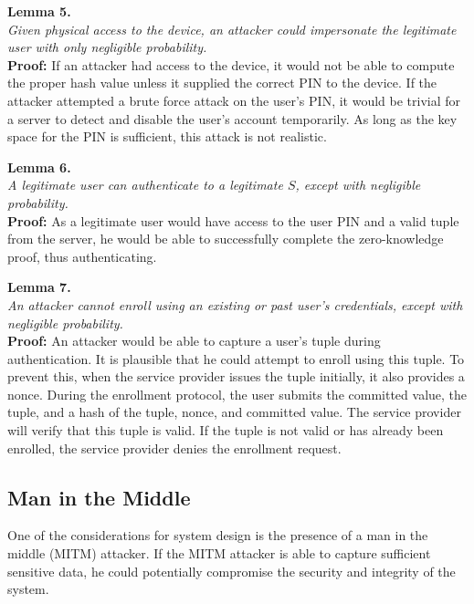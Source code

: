 \noindent \textbf{Lemma 5.} \\
\noindent \emph{Given physical access to the device, an attacker could impersonate the legitimate user with only
negligible probability.} \\
{\bf Proof:}  If an attacker had access to the device, it would not be able to compute the proper hash value unless it
supplied the correct PIN to the device. If the attacker attempted a brute force attack on the user's PIN,
it would be trivial for a server to detect and disable the user's account temporarily. As long as the key space for the
PIN is sufficient, this attack is not realistic.%

\noindent \textbf{Lemma 6.} \\
\noindent \emph{A legitimate user can authenticate to a legitimate $S$, except with negligible probability.} \\
{\bf Proof:}  As a legitimate user would have access to the user PIN and a valid tuple from the server, he would be
able to successfully complete the zero-knowledge proof, thus authenticating.%

\noindent \textbf{Lemma 7.} \\
\noindent \emph{An attacker cannot enroll using an existing or past user's credentials, except with negligible
probability.} \\
{\bf Proof:} An attacker would be able to capture a user's tuple during authentication. It is plausible that he could
attempt to enroll using this tuple. To prevent this, when the service provider issues the tuple initially, it also
provides a nonce. During the enrollment protocol, the user submits the committed value, the tuple, and a hash of the
tuple, nonce, and committed value. The service provider will verify that this tuple is valid. If the tuple is not
valid or has already been enrolled, the service provider denies the enrollment request.%

\subsection{Man in the Middle}
One of the considerations for system design is the presence of a man in the middle (MITM) attacker. If the MITM
attacker is able to capture sufficient sensitive data, he could potentially compromise the security and integrity
of the system. 

